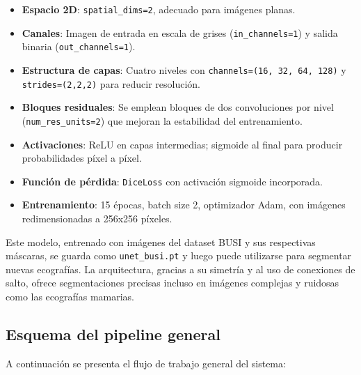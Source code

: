 \documentclass[12pt]{article}
\begin{document}
\begin{itemize}
  \item \textbf{Espacio 2D}: \texttt{spatial\_dims=2}, adecuado para imágenes planas.
  \item \textbf{Canales}: Imagen de entrada en escala de grises (\texttt{in\_channels=1}) y salida binaria (\texttt{out\_channels=1}).
  \item \textbf{Estructura de capas}: Cuatro niveles con \texttt{channels=(16, 32, 64, 128)} y \texttt{strides=(2,2,2)} para reducir resolución.
  \item \textbf{Bloques residuales}: Se emplean bloques de dos convoluciones por nivel (\texttt{num\_res\_units=2}) que mejoran la estabilidad del entrenamiento.
  \item \textbf{Activaciones}: ReLU en capas intermedias; sigmoide al final para producir probabilidades píxel a píxel.
  \item \textbf{Función de pérdida}: \texttt{DiceLoss} con activación sigmoide incorporada.
  \item \textbf{Entrenamiento}: 15 épocas, batch size 2, optimizador Adam, con imágenes redimensionadas a 256x256 píxeles.
\end{itemize}

Este modelo, entrenado con imágenes del dataset BUSI y sus respectivas máscaras, se guarda como \texttt{unet\_busi.pt} y luego puede utilizarse para segmentar nuevas ecografías. La arquitectura, gracias a su simetría y al uso de conexiones de salto, ofrece segmentaciones precisas incluso en imágenes complejas y ruidosas como las ecografías mamarias.

\subsection{Esquema del pipeline general}
A continuación se presenta el flujo de trabajo general del sistema:
\begin{center}
\end{center}
\end{document}
